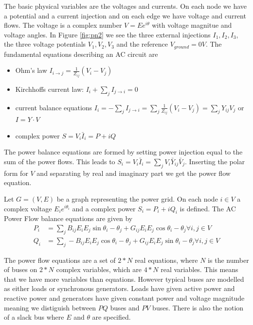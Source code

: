The basic physical variables are the voltages and currents. On each node we have a potential and a current injection and on each edge we have voltage and current flows. The voltage is a complex number $V=Ee^{i\theta}$ with voltage magnitue and voltage angles.  In Figure \ref{fig:pn2} we see the three external injections $I_1,I_2,I_3$, the three voltage potentials $V_1,V_2,V_3$ and the reference $V_{ground}=0V$. The fundamental equations describing an AC circuit are 
\begin{itemize}
\item Ohm's law  $I_{i\rightarrow j}=\frac{1}{Z_{ij}}(V_i-V_j)$
\item Kirchhoffs current law: $I_i+\sum_j I_{j\rightarrow i}=0$
\item current balance equations $I_i=-\sum_jI_{j\rightarrow i}=\sum_j \frac{1}{Z_{ij}}(V_i-V_j)=\sum_j Y_{ij}V_j$ or $I=Y\cdot V$
\item complex power $S=V_i\bar{I}_i=P+iQ$
\end{itemize}

The power balance equations are formed by setting power injection equal to the sum of the power flows. This leads to
$S_i=V_i\bar{I}_i=\sum_j V_i\bar{Y}_{ij}\bar{V}_j$. Inserting the polar form for $V$ and separating by real and imaginary part we get the power flow equation.
\begin{definition}
Let $G=(V,E)$ be a graph representing the power grid. On each node $i\in V$ a complex voltage $E_ie^{i\theta_i}$ and a complex power $S_i=P_i+iQ_i$ is defined. The AC Power Flow balance equations are given by 
\begin{align}
P_i&=\sum_j B_{ij}E_iE_j\sin{\theta_i-\theta_j}+G_{ij}E_iE_j\cos{\theta_i-\theta_j}\forall i,j\in V\\
Q_i&=\sum_j- B_{ij}E_iE_j\cos{\theta_i-\theta_j}+G_{ij}E_iE_j\sin{\theta_i-\theta_j} \forall i,j\in V
\end{align}

\end{definition}
The power flow equations are a set of $2*N$ real equations, where $N$ is the number of buses on $2*N$ complex variables, which are $4*N$ real variables. This means that we have more variables than equations. However typical buses are modelled as either loads or synchronous generators. Loads have given active power and reactive power and generators have given constant power and voltage magnitude meaning we distiguish between $PQ$ buses and $PV$ buses. There is also the notion of a slack bus where $E$ and $\theta$ are specified. 
